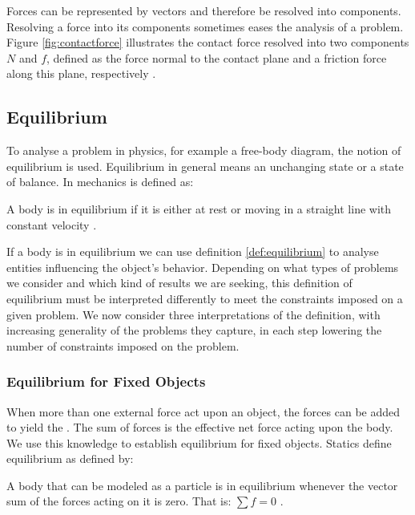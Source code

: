 Forces can be represented by vectors and therefore be resolved into
components. Resolving a force into its components sometimes eases the
analysis of a problem. Figure \vref{fig:contactforce} illustrates the contact force
resolved into two components $N$ and $f$, defined as the force normal
to the contact plane and a friction force along this plane,
respectively .

\subsection{Equilibrium}
\label{sec:equilibrium}
To analyse a problem in physics, for example a free-body diagram,
the notion of equilibrium is used.
%
Equilibrium in general means an unchanging state or a state of
balance. In mechanics  is defined as:

\begin{definition}
\label{def:equilibrium}
A body is in equilibrium if it is either at rest or moving in a
straight line with constant velocity .
\end{definition}

If a body is in equilibrium we can use definition
\vref{def:equilibrium} to analyse entities influencing the object's
behavior.
%
Depending on what types of problems we consider and which kind of
results we are seeking, this definition of equilibrium must be
interpreted differently to meet the constraints imposed on a given
problem.
%
We now consider three interpretations of the definition, with
increasing generality of the problems they capture, in each step
lowering the number of constraints imposed on the problem. \\

\subsubsection{Equilibrium for Fixed Objects}
\label{sec:equilibrium_for_fixed_objects}
When more than one external force act upon an object, the forces can
be added to yield the . The sum of forces is the
effective net force acting upon the body. We use this knowledge to
establish equilibrium for fixed objects.
Statics define equilibrium as  defined by:

\begin{definition}
\label{static-equilibrium}
A body that can be modeled as a particle is in equilibrium whenever
the vector sum of the forces acting on it is zero.
That is: $\sum f = 0$
.
\end{definition}

